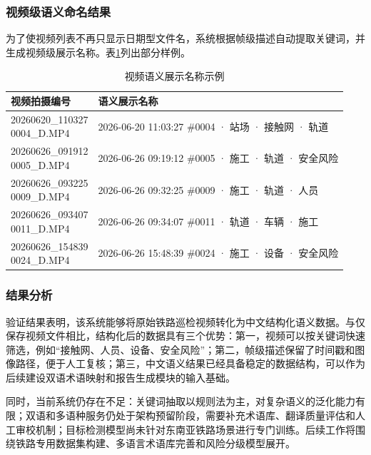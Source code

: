 \documentclass[UTF8,a4paper,zihao=-4]{ctexart}
\begin{document}
\subsubsection{视频级语义命名结果}

为了使视频列表不再只显示日期型文件名，系统根据帧级描述自动提取关键词，并生成视频级展示名称。表\ref{tab:sample-videos}列出部分样例。

\begin{table}[H]
\centering
\caption{视频语义展示名称示例}
\label{tab:sample-videos}
\small
\begin{tabularx}{\textwidth}{>{\raggedright\arraybackslash\ttfamily\scriptsize}p{}>{\raggedright\arraybackslash\small}X}
\toprule
视频拍摄编号 & 语义展示名称 \\
\midrule
\shortstack[l]{20260620\_110327\\0004\_D.MP4} & 2026-06-20 11:03:27 \#0004 · 站场 · 接触网 · 轨道 \\
\shortstack[l]{20260626\_091912\\0005\_D.MP4} & 2026-06-26 09:19:12 \#0005 · 施工 · 轨道 · 安全风险 \\
\shortstack[l]{20260626\_093225\\0009\_D.MP4} & 2026-06-26 09:32:25 \#0009 · 施工 · 轨道 · 人员 \\
\shortstack[l]{20260626\_093407\\0011\_D.MP4} & 2026-06-26 09:34:07 \#0011 · 轨道 · 车辆 · 施工 \\
\shortstack[l]{20260626\_154839\\0024\_D.MP4} & 2026-06-26 15:48:39 \#0024 · 施工 · 设备 · 安全风险 \\
\bottomrule
\end{tabularx}
\end{table}

\subsubsection{结果分析}

验证结果表明，该系统能够将原始铁路巡检视频转化为中文结构化语义数据。与仅保存视频文件相比，结构化后的数据具有三个优势：第一，视频可以按关键词快速筛选，例如“接触网、人员、设备、安全风险”；第二，帧级描述保留了时间戳和图像路径，便于人工复核；第三，中文语义结果已经具备稳定的数据结构，可以作为后续建设双语术语映射和报告生成模块的输入基础。

同时，当前系统仍存在不足：关键词抽取以规则法为主，对复杂语义的泛化能力有限；双语和多语种服务仍处于架构预留阶段，需要补充术语库、翻译质量评估和人工审校机制；目标检测模型尚未针对东南亚铁路场景进行专门训练。后续工作将围绕铁路专用数据集构建、多语言术语库完善和风险分级模型展开。
\end{document}
